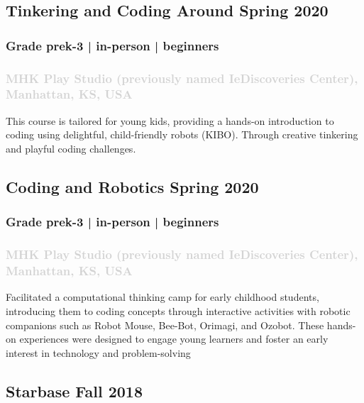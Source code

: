 \documentclass[11pt]{article}
\begin{document}
\label{sec: Tinkering} 
\subsection{ Tinkering and Coding Around \hfill  \normalfont  Spring 2020 }  
  \subsubsection{ Grade prek-3 | in-person | beginners  }
  \subsubsection{ \textcolor{lightgray}{\normalfont MHK Play Studio (previously named IeDiscoveries Center), Manhattan, KS, USA   }}
 \vspace{0.2em} %
  \noindent This course is tailored for young kids, providing a hands-on introduction to coding using delightful, child-friendly robots (KIBO). Through creative tinkering and playful coding challenges.
\vspace{0.8em} %

\label{sec: Robotics1} 
\subsection{ Coding and Robotics  \hfill  \normalfont  Spring 2020 } 
 \subsubsection{ Grade prek-3 | in-person | beginners  }
  \subsubsection{ \textcolor{lightgray}{\normalfont MHK Play Studio (previously named IeDiscoveries Center), Manhattan, KS, USA   }}
 \vspace{0.2em} %
  \noindent Facilitated a computational thinking camp for early childhood students, introducing them to coding concepts through interactive activities with robotic companions such as Robot Mouse, Bee-Bot, Orimagi, and Ozobot. These hands-on experiences were designed to engage young learners and foster an early interest in technology and problem-solving
\vspace{0.8em} %

\label{sec: Starbase} 
\subsection{Starbase \hfill  \normalfont  Fall 2018 } 
\end{document}
